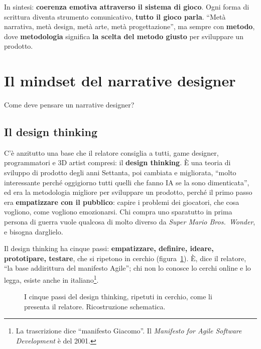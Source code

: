 In sintesi: \textbf{coerenza emotiva attraverso il sistema di gioco}. Ogni
forma di scrittura diventa strumento comunicativo, \textbf{tutto il gioco
parla}. ``Metà narrativa, metà design, metà arte, metà progettazione'', ma
sempre con \textbf{metodo}, dove \textbf{metodologia} significa \textbf{la
scelta del metodo giusto} per sviluppare un prodotto.

\section{Il mindset del narrative designer}
\label{p3:sec:mindset}

Come deve pensare un narrative designer?

\subsection{Il design thinking}

C'è anzitutto una base che il relatore consiglia a tutti, game designer,
programmatori e 3D artist compresi: il \textbf{design thinking}. È una teoria
di sviluppo di prodotto degli anni Settanta, poi cambiata e migliorata,
``molto interessante perché oggigiorno tutti quelli che fanno IA se la sono
dimenticata'', ed era la metodologia migliore per sviluppare un prodotto,
perché il primo passo era \textbf{empatizzare con il pubblico}: capire i
problemi dei giocatori, che cosa vogliono, come vogliono emozionarsi. Chi
compra uno sparatutto in prima persona di guerra vuole qualcosa di molto
diverso da \emph{Super Mario Bros.\ Wonder}, e bisogna darglielo.

Il design thinking ha cinque passi: \textbf{empatizzare, definire, ideare,
prototipare, testare}, che si ripetono in cerchio
(figura~\ref{p3:fig:design}). È, dice il relatore, ``la base addirittura del
manifesto Agile''; chi non lo conosce lo cerchi online e lo legga, esiste
anche in italiano\footnote{La trascrizione dice ``manifesto Giacomo''.
Il \emph{Manifesto for Agile Software Development} è del 2001.}.

\begin{figure}[htbp]
\centering
{}
\caption{I cinque passi del design thinking, ripetuti in cerchio, come li
presenta il relatore. Ricostruzione schematica.}
\label{p3:fig:design}
\end{figure}

